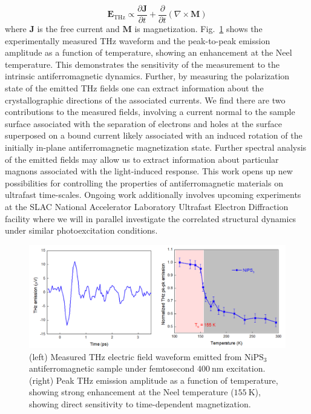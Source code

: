 \begin{equation}
\mathbf{E}_\text{THz} \propto \frac{\partial\mathbf{J}}{\partial t} + \frac{\partial}{\partial t} (\nabla \times \mathbf{M})
\end{equation}
where \(\mathbf{J}\) is the free current and \(\mathbf{M}\) is magnetization. 
Fig.~\ref{fig:NiPS3} shows the experimentally measured THz waveform and the peak-to-peak emission amplitude as a function of temperature, showing an enhancement at the Neel temperature.
This demonstrates the sensitivity of the measurement to the intrinsic antiferromagnetic dynamics.
Further, by measuring the polarization state of the emitted THz fields one can extract information about the crystallographic directions of the associated currents.
We find there are two contributions to the measured fields, involving a current normal to the sample surface associated with the separation of electrons and holes at the surface superposed on a bound current likely associated with an induced rotation of the initially in-plane antiferromagnetic magnetization state.
Further spectral analysis of the emitted fields may allow us to extract information about particular magnons associated with the light-induced response.
This work opens up new possibilities for controlling the properties of antiferromagnetic materials on ultrafast time-scales. 
Ongoing work additionally involves upcoming experiments at the SLAC National Accelerator Laboratory Ultrafast Electron Diffraction facility where we will in parallel investigate the correlated structural dynamics under similar photoexcitation conditions.

\begin{figure}[ht]
	\centering\includegraphics[width=1.0\linewidth]{figures/NiPS3}
	\caption{
		(left)  Measured THz electric field waveform emitted from \(\mathrm{NiPS_3}\) antiferromagnetic sample under femtosecond \(400~\mathrm{nm}\) excitation.
		(right) Peak THz emission amplitude as a function of temperature, showing strong enhancement at the Neel temperature (\(155~\mathrm{K}\)), showing direct sensitivity to time-dependent magnetization.
	}
	\label{fig:NiPS3}
\end{figure}

